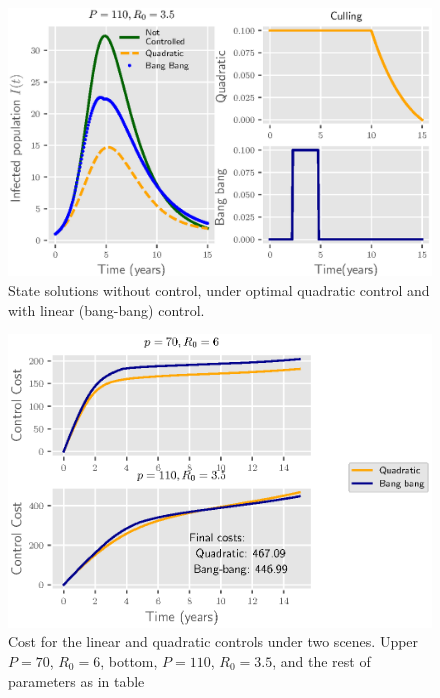 \begin{figure}[H]
  \centering
  \includegraphics{Figures/figure_2_culling}
  \caption{State solutions without control, under optimal quadratic control 
  and with linear (bang-bang) control.}
  \label{fig:figure2culling}
\end{figure}

\begin{figure}[H]
  \centering
  \includegraphics{Figures/figure_3_culling}
  \caption{Cost for the linear and quadratic controls under two scenes. Upper
  $P=70$, $R_0=6$, bottom, $P=110$, $R_0=3.5$, and the rest of parameters as 
  in table}
  \label{fig:figure3culling}
\end{figure}